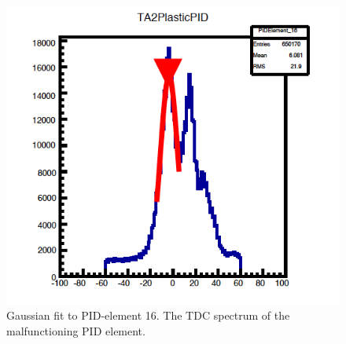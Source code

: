 \begin{figure}[H]
\begin{center}
\includegraphics[scale=0.4]{pictures/png/pidtdcgaus16.png}
\caption{Gaussian fit to PID-element 16. The TDC spectrum of the malfunctioning PID element.}
\label{pidtdcgaus16}
\end{center}
\end{figure}



